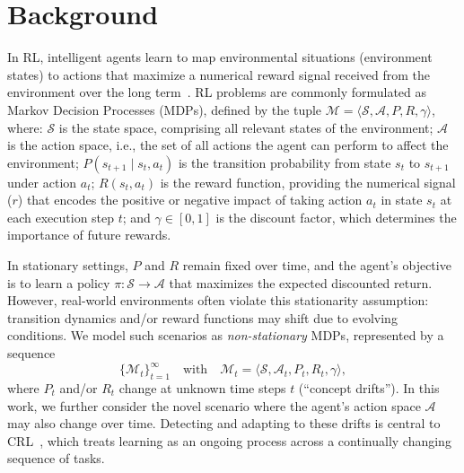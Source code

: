 
\section{Background}
\label{sec:background}

In \ac{RL}, intelligent agents learn to map environmental situations (environment states) to actions that maximize a numerical reward signal received from the environment over the long term~\cite{sutton18}. \ac{RL} problems are commonly formulated as Markov Decision Processes (MDPs), defined by the tuple $\mathcal{M} = \langle \mathcal{S}, \mathcal{A}, P, R, \gamma \rangle$, where:
$\mathcal{S}$ is the state space, comprising all relevant states of the environment;
$\mathcal{A}$ is the action space, i.e., the set of all actions the agent can perform to affect the environment;
$P(s_{t+1} \mid s_t, a_t)$ is the transition probability from state {\color{purple}$s_t$} to {\color{purple}$s_{t+1}$} under action {\color{purple}$a_t$};
$R(s_t, a_t)$ is the reward function, providing the numerical signal ($r$) that encodes the positive or negative impact of taking action {\color{purple}$a_t$} in state {\color{purple}$s_t$} at each execution step $t$; and $\gamma \in [0, 1]$ is the discount factor, which determines the importance of future rewards.

In stationary settings, $P$ and $R$ remain fixed over time, and the agent’s objective is to learn a policy $\pi: \mathcal{S} \to \mathcal{A}$ that maximizes the expected discounted return. However, real-world environments often violate this stationarity assumption: transition dynamics and/or reward functions may shift due to evolving conditions. We model such scenarios as \emph{non-stationary} MDPs, represented by a sequence
\[
\{\mathcal{M}_t\}_{t=1}^\infty
\quad\text{with}\quad
\mathcal{M}_t = \bigl\langle \mathcal{S}, \mathcal{A}_t, P_t, R_t, \gamma \bigr\rangle,
\]
where $P_t$ and/or $R_t$ change at unknown time steps $t$ (``concept drifts''). In this work, we further consider the novel scenario where the agent's action space $\mathcal{A}$ may also change over time. Detecting and adapting to these drifts is central to \ac{CRL}~\cite{khetarpal2022continualreinforcementlearningreview,abel2023definitioncontinualreinforcementlearning}, which treats learning as an ongoing process across a continually changing sequence of tasks.

